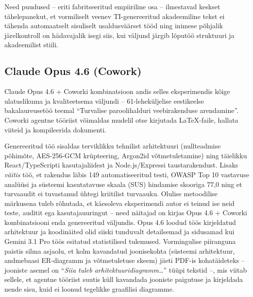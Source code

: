 Need puudused -- eriti fabritseeritud empiiriline osa -- ilmestavad keskset tähelepanekut, et vormiliselt veenev TI-genereeritud akadeemiline tekst ei tähenda automaatselt sisuliselt usaldusväärset tööd ning inimese põhjalik järelkontroll on hädavajalik isegi siis, kui väljund järgib lõputöö struktuuri ja akadeemilist stiili.

\subsection{Claude Opus 4.6 (Cowork)} \label{subsec:opus-toolo}

Claude Opus 4.6 + Coworki kombinatsioon andis selles eksperimendis kõige ulatuslikuma ja kvaliteetsema väljundi -- 61-leheküljelise eestikeelse bakalaureusetöö teemal ``Turvalise paroolihalduri veebirakenduse arendamine''. Coworki agentne tööriist võimaldas mudelil otse kirjutada \LaTeX{}-faile, hallata viiteid ja kompileerida dokumenti.

Genereeritud töö sisaldas terviklikku tehnilist arhitektuuri (nullteadmise põhimõte, AES-256-GCM krüpteering, Argon2id võtmetuletamine) ning täielikku React/TypeScripti kasutajaliidest ja Node.js/Expressi taustarakendust. Lisaks \emph{väitis} töö, et rakendus läbis 149 automatiseeritud testi, OWASP Top 10 vastavuse analüüsi ja süsteemi kasutatavuse skaala (SUS) hindamise skooriga 77,0 ning et turvaaudit ei tuvastanud ühtegi kriitilist turvaauku. Olulise metoodilise märkusena tuleb rõhutada, et käesoleva eksperimendi autor ei teinud ise neid teste, auditit ega kasutajauuringut -- need näitajad on kirjas Opus 4.6 + Coworki kombinatsiooni enda genereeritud väljundis. Opus 4.6 loodud töös kirjeldatud arhitektuur ja koodinäited olid siiski tunduvalt detailsemad ja sidusamad kui Gemini 3.1 Pro töös esitatud statistilised tulemused. Vormingulise piiranguna paistis silma asjaolu, et kolm kavandatud joonisekohta (süsteemi arhitektuur, andmebaasi ER-diagramm ja võtmetuletuse skeem) jäeti PDF-is kohatäideteks -- jooniste asemel on ``\textit{Siia tuleb arhitektuuridiagramm\dots}'' tüüpi tekstid --, mis viitab sellele, et agentne tööriist suutis küll kavandada jooniste paigutuse ja kirjeldada nende sisu, kuid ei loonud tegelikke graafilisi diagramme.

